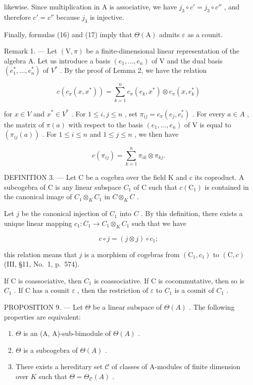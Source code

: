 likewise. Since multiplication in A is associative, we have \(j_{3} \circ c' = j_{3} \circ c''\) , and therefore \(c' = c''\) because \(j_{3}\) is injective.

Finally, formulas (16) and (17) imply that \(\Theta(\mathrm{A})\) admits \(\varepsilon\) as a counit.

Remark 1. --- Let \((\mathrm{V},\pi)\) be a finite-dimensional linear representation of the algebra A. Let us introduce a basis \((e_{1},\ldots,e_{n})\) of V and the dual basis \((e_{1}^{*},\ldots,e_{n}^{*})\) of \(V^{*}\) . By the proof of Lemma 2, we have the relation

\[
c (c _ {\pi} (x, x ^ {*})) = \sum_ {k = 1} ^ {n} c _ {\pi} (e _ {k}, x ^ {*}) \otimes c _ {\pi} (x, e _ {k} ^ {*})\tag{19}
\]

for \(x \in V\) and \(x^{*} \in V^{*}\) . For \(1 \leqslant i, j \leqslant n\) , set \(\pi_{ij} = c_{\pi}(e_j, e_i^*)\) . For every \(a \in A\) , the matrix of \(\pi(a)\) with respect to the basis \((e_1, \ldots, e_n)\) of V is equal to \((\pi_{ij}(a))\) . For \(1 \leqslant i \leqslant n\) and \(1 \leqslant j \leqslant n\) , we then have

\[
c (\pi_ {i j}) = \sum_ {k = 1} ^ {n} \pi_ {i k} \otimes \pi_ {k j}.\tag{20}
\]

DEFINITION 3. --- Let C be a cogebra over the field K and c its coproduct. A subcogebra of C is any linear subspace \(C_{1}\) of C such that \(c(\mathrm{C}_{1})\) is contained in the canonical image of \(C_{1} \otimes_{K} C_{1}\) in \(C \otimes_{K} C\) .

Let \(j\) be the canonical injection of \(C_1\) into \(C\) . By this definition, there exists a unique linear mapping \(c_1: C_1 \to C_1 \otimes_K C_1\) such that we have

\[
c \circ j = (j \otimes j) \circ c _ {1};\tag{21}
\]

this relation means that \(j\) is a morphism of cogebras from \((\mathrm{C}_1, c_1)\) to \((\mathrm{C}, c)\) (III, §11, No.~1, p.~574).

If C is coassociative, then \(C_{1}\) is coassociative. If C is cocommutative, then so is \(C_{1}\) . If C has a counit \(\varepsilon\) , then the restriction of \(\varepsilon\) to \(C_{1}\) is a counit of \(C_{1}\) .

PROPOSITION 9. --- Let \(\Theta\) be a linear subspace of \(\Theta(A)\) . The following properties are equivalent:

\begin{enumerate}
\def\labelenumi{(\roman{enumi})}
\item
  \(\Theta\) is an (A, A)-sub-bimodule of \(\Theta(A)\) .
\item
  \(\Theta\) is a subcogebra of \(\Theta(A)\) .
\item
  There exists a hereditary set \(\mathcal{C}\) of classes of A-modules of finite dimension over \(K\) such that \(\Theta = \Theta_{\mathcal{C}}(A)\) .
\end{enumerate}


